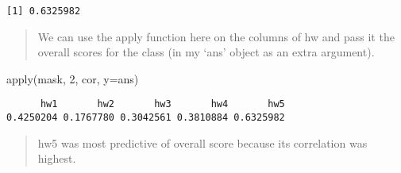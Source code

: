 \documentclass[
  letterpaper,
  DIV=11,
  numbers=noendperiod]{scrartcl}
\newenvironment{Shaded}{\begin{snugshade}}{\end{snugshade}}
\newcommand{\AttributeTok}[1]{\textcolor[rgb]{0.40,0.45,0.13}{#1}}
\newcommand{\DecValTok}[1]{\textcolor[rgb]{0.68,0.00,0.00}{#1}}
\newcommand{\FunctionTok}[1]{\textcolor[rgb]{0.28,0.35,0.67}{#1}}
\newcommand{\NormalTok}[1]{\textcolor[rgb]{0.00,0.23,0.31}{#1}}
\begin{document}
\begin{verbatim}
[1] 0.6325982
\end{verbatim}

\begin{quote}
We can use the apply function here on the columns of hw and pass it the
overall scores for the class (in my `ans' object as an extra argument).
\end{quote}

\begin{Shaded}
\begin{Highlighting}[]
\FunctionTok{apply}\NormalTok{(mask, }\DecValTok{2}\NormalTok{, cor, }\AttributeTok{y=}\NormalTok{ans)}
\end{Highlighting}
\end{Shaded}

\begin{verbatim}
      hw1       hw2       hw3       hw4       hw5 
0.4250204 0.1767780 0.3042561 0.3810884 0.6325982 
\end{verbatim}

\begin{quote}
hw5 was most predictive of overall score because its correlation was
highest.
\end{quote}
\end{document}
